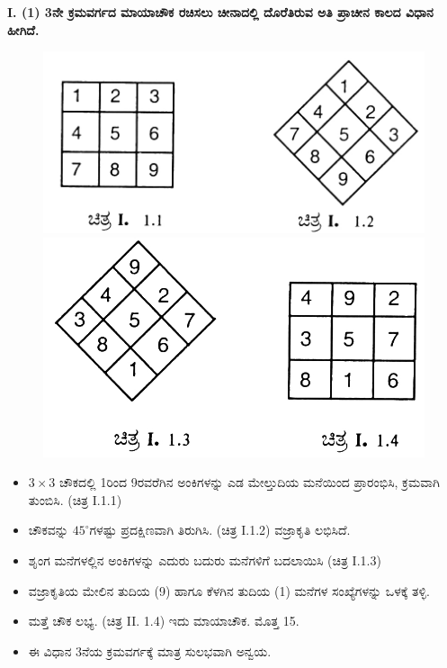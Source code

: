 \noindent\textbf{I. (1) 3ನೇ ಕ್ರಮವರ್ಗದ ಮಾಯಾಚೌಕ ರಚಿಸಲು ಚೀನಾದಲ್ಲಿ ದೊರೆತಿರುವ ಅತಿ ಪ್ರಾಚೀನ ಕಾಲದ ವಿಧಾನ ಹೀಗಿದೆ.}

\begin{figure}[h]
\includegraphics{src/figures/chap3/fig3.1.jpg}\\
\includegraphics{src/figures/chap3/fig3.2.jpg}
\end{figure}

\begin{itemize}
	\item $3 \times 3$ ಚೌಕದಲ್ಲಿ 1ರಿಂದ 9ರವರೆಗಿನ ಅಂಕಿಗಳನ್ನು ಎಡ ಮೇಲ್ತುದಿಯ ಮನೆಯಿಂದ ಪ್ರಾರಂಭಿಸಿ, ಕ್ರಮವಾಗಿ ತುಂಬಿಸಿ. (ಚಿತ್ರ I.1.1)
	\item ಚೌಕವನ್ನು $45^\circ$ಗಳಷ್ಟು ಪ್ರದಕ್ಷಿಣವಾಗಿ ತಿರುಗಿಸಿ. (ಚಿತ್ರ I.1.2) ವಜ್ರಾಕೃತಿ ಲಭಿಸಿದೆ.
	\item ಶೃಂಗ ಮನೆಗಳಲ್ಲಿನ ಅಂಕಿಗಳನ್ನು ಎದುರು ಬದುರು ಮನೆಗಳಿಗೆ ಬದಲಾಯಿಸಿ (ಚಿತ್ರ I.1.3)
	\item ವಜ್ರಾಕೃತಿಯ ಮೇಲಿನ ತುದಿಯ (9) ಹಾಗೂ ಕೆಳಗಿನ ತುದಿಯ (1) ಮನೆಗಳ ಸಂಖ್ಯೆಗಳನ್ನು ಒಳಕ್ಕೆ ತಳ್ಳಿ.
	\item ಮತ್ತೆ ಚೌಕ ಲಭ್ಯ. (ಚಿತ್ರ II. 1.4) ಇದು ಮಾಯಾಚೌಕ. ಮೊತ್ತ 15.
	\item ಈ ವಿಧಾನ 3ನೆಯ ಕ್ರಮವರ್ಗಕ್ಕೆ ಮಾತ್ರ ಸುಲಭವಾಗಿ ಅನ್ವಯ.
\end{itemize}

